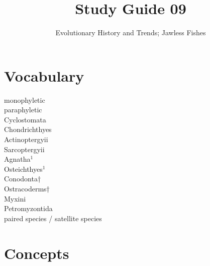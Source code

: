 \documentclass[nofonts, letterpaper]{tufte-handout}
\title{Study Guide 09}
\author{Evolutionary History and Trends; Jawless Fishes}
\date{} %
\begin{document}
\maketitle	%


\section{Vocabulary}  
\vspace{-1\baselineskip}
\begin{multicols}{2}
monophyletic \\
paraphyletic \\
Cyclostomata \\
Chondrichthyes \\
Actinoptergyii \\
Sarcoptergyii \\
Agnatha$^1$ \\
Osteichthyes$^1$ \\
Conodonta† \\
Ostracoderms† \\
Myxini \\
Petromyzontida \\
paired species / satellite species 
\end{multicols}

\section{Concepts}
\end{document}
